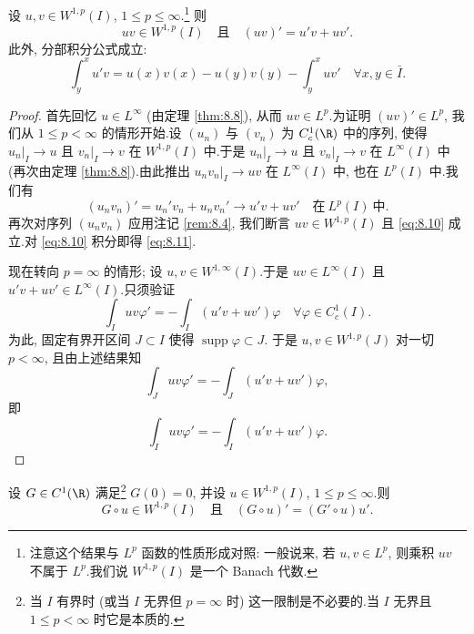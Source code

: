 \begin{corollary}[乘积的求导]
\label{cor:8.10}
设 $u,v\in W^{1,p}(I)$, $1\le p\le\infty$.\footnote{注意这个结果与
$L^p$ 函数的性质形成对照: 一般说来, 若 $u,v\in L^p$, 则乘积 $uv$ 不属于
$L^p$.我们说 $W^{1,p}(I)$ 是一个 Banach 代数.} 则
\begin{equation}
uv\in W^{1,p}(I)\quad\text{且}\quad
(uv)'=u'v+uv'.
\label{eq:8.10}
\end{equation}
此外, 分部积分公式成立:
\begin{equation}
\int_y^x u'v=u(x)v(x)-u(y)v(y)-\int_y^x uv'\quad\forall x,y\in\bar I.
\label{eq:8.11}
\end{equation}
\end{corollary}

\begin{proof}
首先回忆 $u\in L^\infty$ (由定理  \ref{thm:8.8}), 从而 $uv\in L^p$.为证明
$(uv)'\in L^p$, 我们从 $1\le p<\infty$ 的情形开始.设 $(u_n)$ 与 $(v_n)$ 为
$C_c^1(\R)$ 中的序列, 使得 $u_n|_I\to u$ 且 $v_n|_I\to v$ 在 $W^{1,p}(I)$
中.于是 $u_n|_I\to u$ 且 $v_n|_I\to v$ 在 $L^\infty(I)$ 中 (再次由定理
 \ref{thm:8.8}).由此推出 $u_nv_n|_I\to uv$ 在 $L^\infty(I)$ 中, 也在 $L^p(I)$
中.我们有
\begin{equation*}
(u_nv_n)'=u_n'v_n+u_nv_n'\to u'v+uv'\quad\text{在}\ L^p(I)\ \text{中}.
\end{equation*}
再次对序列 $(u_nv_n)$ 应用注记 \ref{rem:8.4}, 我们断言 $uv\in W^{1,p}(I)$
且 \eqref{eq:8.10} 成立.对 \eqref{eq:8.10} 积分即得 \eqref{eq:8.11}.

现在转向 $p=\infty$ 的情形; 设 $u,v\in W^{1,\infty}(I)$.于是
$uv\in L^\infty(I)$ 且 $u'v+uv'\in L^\infty(I)$.只须验证
\begin{equation*}
\int_I uv\varphi'=-\int_I(u'v+uv')\varphi\quad\forall\varphi\in C_c^1(I).
\end{equation*}
为此, 固定有界开区间 $J\subset I$ 使得 $\operatorname{supp}\varphi\subset J$.
于是 $u,v\in W^{1,p}(J)$ 对一切 $p<\infty$, 且由上述结果知
\begin{equation*}
\int_J uv\varphi'=-\int_J(u'v+uv')\varphi,
\end{equation*}
即
\begin{equation*}
\int_I uv\varphi'=-\int_I(u'v+uv')\varphi.
\end{equation*}
\end{proof}

\begin{corollary}[复合的求导]
\label{cor:8.11}
设 $G\in C^1(\R)$ 满足\footnote{当 $I$ 有界时 (或当 $I$ 无界但 $p=\infty$ 时)
这一限制是不必要的.当 $I$ 无界且 $1\le p<\infty$ 时它是本质的.}
$G(0)=0$, 并设 $u\in W^{1,p}(I)$, $1\le p\le\infty$.则
\begin{equation*}
G\circ u\in W^{1,p}(I)\quad\text{且}\quad(G\circ u)'=(G'\circ u)u'.
\end{equation*}
\end{corollary}

